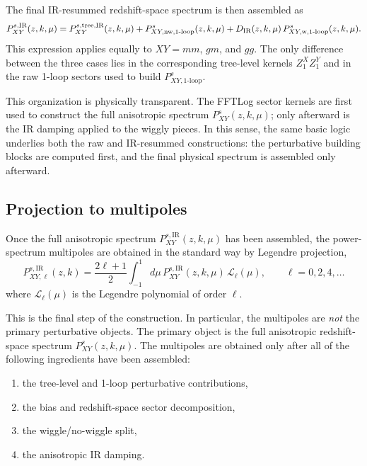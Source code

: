 \documentclass[a4paper,11pt]{article}
\renewcommand{\emph}[1]{\textit{#1}}
\newcommand{\<}{\langle}
\renewcommand{\>}{\rangle}
\begin{document}
The final IR-resummed redshift-space spectrum is then assembled as
\begin{equation}
P_{XY}^{s,\mathrm{IR}}(z,k,\mu)
=
P_{XY}^{s,\mathrm{tree,IR}}(z,k,\mu)
+
P_{XY,\mathrm{nw},1\text{-loop}}^s(z,k,\mu)
+
D_{\rm IR}(z,k,\mu)\,
P_{XY,\mathrm{w},1\text{-loop}}^s(z,k,\mu).
\label{eq:PXY_IR_final_note}
\end{equation}
This expression applies equally to \(XY=mm\), \(gm\), and \(gg\). The only difference between the three cases lies in the corresponding tree-level kernels \(Z_1^X Z_1^Y\) and in the raw 1-loop sectors used to build \(P_{XY,1\text{-loop}}^s\).

This organization is physically transparent. The FFTLog sector kernels are first used to construct the full anisotropic spectrum \(P_{XY}^s(z,k,\mu)\); only afterward is the IR damping applied to the wiggly pieces. In this sense, the same basic logic underlies both the raw and IR-resummed constructions: the perturbative building blocks are computed first, and the final physical spectrum is assembled only afterward.

\subsection{Projection to multipoles}

Once the full anisotropic spectrum \(P_{XY}^{s,\mathrm{IR}}(z,k,\mu)\) has been assembled, the power-spectrum multipoles are obtained in the standard way by Legendre projection,
\begin{equation}
P_{XY,\ell}^{s,\mathrm{IR}}(z,k)
=
\frac{2\ell+1}{2}
\int_{-1}^{1}d\mu\,
P_{XY}^{s,\mathrm{IR}}(z,k,\mu)\,
\mathcal L_\ell(\mu),
\qquad \ell=0,2,4,\dots
\label{eq:Pell_projection_note}
\end{equation}
where \(\mathcal L_\ell(\mu)\) is the Legendre polynomial of order \(\ell\).

This is the final step of the construction. In particular, the multipoles are \emph{not} the primary perturbative objects. The primary object is the full anisotropic redshift-space spectrum \(P_{XY}^s(z,k,\mu)\). The multipoles are obtained only after all of the following ingredients have been assembled:
\begin{enumerate}
\item the tree-level and 1-loop perturbative contributions,
\item the bias and redshift-space sector decomposition,
\item the wiggle/no-wiggle split,
\item the anisotropic IR damping.
\end{enumerate}
\end{document}
